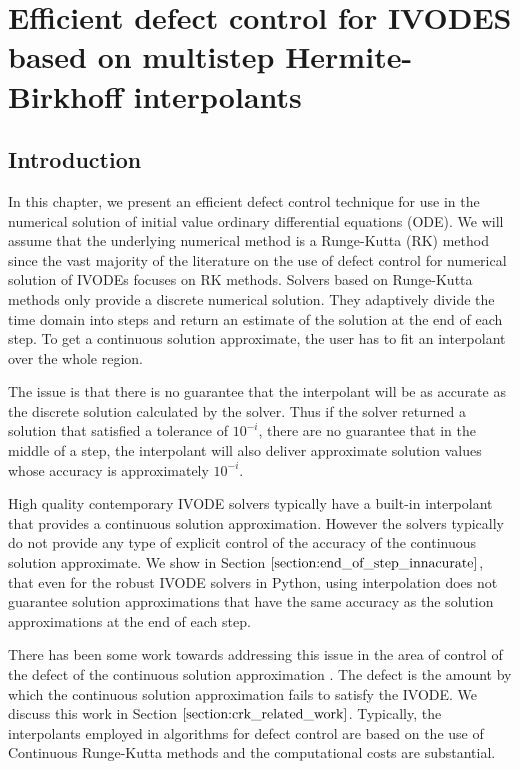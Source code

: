 %
%

\chapter{Efficient defect control for IVODES based on multistep Hermite-Birkhoff interpolants}
\label{chapter:defect_control}
\section{Introduction}

In this chapter, we present an efficient defect control technique for use in the numerical solution of initial value ordinary differential equations (ODE). We will assume that the underlying numerical method is a Runge-Kutta (RK) method since the vast majority of the literature on the use of defect control for numerical solution of IVODEs focuses on RK methods. Solvers based on Runge-Kutta methods only provide a discrete numerical solution. They adaptively divide the time domain into steps and return an estimate of the solution at the end of each step. To get a continuous solution approximate, the user has to fit an interpolant over the whole region.

The issue is that there is no guarantee that the interpolant will be as accurate as the discrete solution calculated by the solver. Thus if the solver returned a solution that satisfied a tolerance of $10^{-i}$, there are no guarantee that in the middle of a step, the interpolant will also deliver approximate solution values whose accuracy is approximately $10^{-i}$. 

High quality contemporary IVODE solvers typically have a built-in interpolant that provides a continuous solution approximation. However the solvers typically do not provide any type of explicit control of the accuracy of the continuous solution approximate. We show in Section $\ref{section:end_of_step_innacurate}$, that even for the robust IVODE solvers in Python, using interpolation does not guarantee solution approximations that have the same accuracy as the solution approximations at the end of each step. 


There has been some work towards addressing this issue in the area of control of the defect of the continuous solution approximation \cites{MR2600928}{MR1950917}{MR1803189}{MR1239829}{MR997658}{MR996053}. The defect is the amount by which the continuous solution approximation fails to satisfy the IVODE. We discuss this work in Section $\ref{section:crk_related_work}$. Typically, the interpolants employed in algorithms for defect control are based on the use of Continuous Runge-Kutta methods and the computational costs are substantial. 

